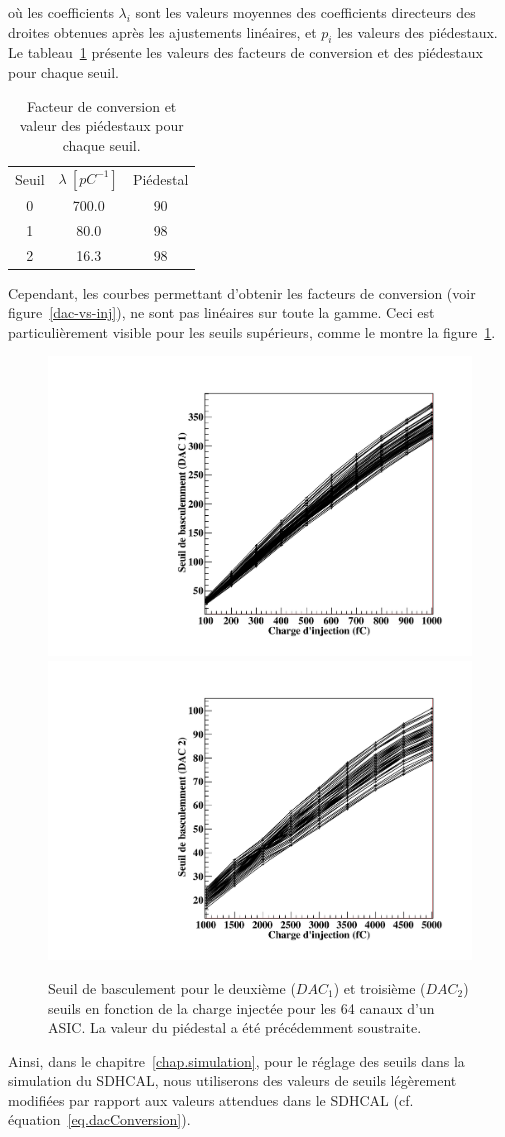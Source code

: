 où les coefficients $\lambda_i$ sont les valeurs moyennes des coefficients directeurs des droites obtenues après les ajustements linéaires, et $p_i$ les valeurs des piédestaux.
Le tableau~\ref{tab.lambdas} présente les valeurs des facteurs de conversion et des piédestaux pour chaque seuil.
\begin{table}[!ht]
  \begin{center}
    \begin{tabular}{c|c|c}
      \rowcolor{black!20!white}Seuil & $\lambda~[pC^{-1}]$ & Piédestal\\
      \rowcolor{black!5!white}\hline
      \rowcolor{black!5!white}0 & 700.0 & 90\\
      \rowcolor{black!5!white}1 & 80.0 & 98\\
      \rowcolor{black!5!white}2 & 16.3 & 98
    \end{tabular}
  \end{center}  
  \caption{Facteur de conversion et valeur des piédestaux pour chaque seuil.}
  \label{tab.lambdas}
\end{table}
Cependant, les courbes permettant d'obtenir les facteurs de conversion (voir figure~\ref{dac-vs-inj}), ne sont pas linéaires sur toute la gamme. Ceci est particulièrement visible pour les seuils supérieurs, comme le montre la figure~\ref{dac-vs-inj_12}.
\begin{figure}[!ht]
  \centering
  \includegraphics[width=.45\textwidth]{SDHCAL/figs/Dac1Lin.pdf}
  \includegraphics[width=.45\textwidth]{SDHCAL/figs/Dac2Lin.pdf}
  \caption{Seuil de basculement pour le deuxième ($DAC_1$) et troisième ($DAC_2$) seuils en fonction de la charge injectée pour les 64 canaux d'un ASIC. La valeur du piédestal a été précédemment soustraite.}
  \label{dac-vs-inj_12}
\end{figure}
Ainsi, dans le chapitre~\ref{chap.simulation}, pour le réglage des seuils dans la simulation du SDHCAL, nous utiliserons des valeurs de seuils légèrement modifiées par rapport aux valeurs attendues dans le SDHCAL (cf. équation~\ref{eq.dacConversion}).

